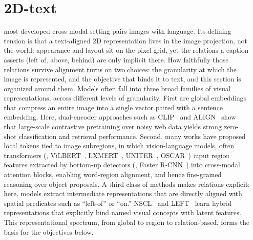 \section{2D-text}
\label{cross_modality_2d_text}
 most developed cross-modal setting pairs images with language. 
Its defining tension is that a text-aligned 2D representation lives in the image projection, not the world: appearance and layout sit on the pixel grid, yet the relations a caption asserts (left of, above, behind) are only implicit there. 
How faithfully those relations survive alignment turns on two choices: the granularity at which the image is represented, and the objective that binds it to text, and this section is organized around them. 
Models often fall into three broad families of visual representations, across different levels of granularity. First are global embeddings that compress an entire image into a single vector paired with a sentence embedding. 
Here, dual-encoder approaches such as CLIP~\cite{radford2021learning} and ALIGN~\cite{jia2021scaling} show that large-scale contrastive pretraining over noisy web data yields strong zero-shot classification and retrieval performance. 
Second, many works have proposed local tokens tied to image subregions, in which vision-language models, often transformers (\eg, ViLBERT~\cite{lu2019vilbert}, LXMERT~\cite{tan2019lxmert}, UNITER~\cite{chen2020uniter}, OSCAR~\cite{li2020oscar}) input region features extracted by bottom-up detectors (\eg, Faster R-CNN~\cite{ren2015faster}) into cross-modal attention blocks, enabling word-region alignment, and hence fine-grained reasoning over object proposals. 
A third class of methods makes relations explicit; here, models extract intermediate representations that are directly aligned with spatial predicates such as ``left-of'' or ``on.'' NSCL~\cite{mao2019neuro} and LEFT~\cite{hsu2023s} learn hybrid representations that explicitly bind named visual concepts with latent features. 
This representational spectrum, from global to region to relation-based, forms the basis for the objectives below.

